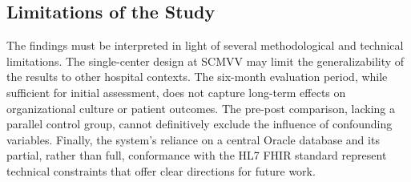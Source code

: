 \subsection{Limitations of the Study}
The findings must be interpreted in light of several methodological and technical limitations. The single-center design at SCMVV may limit the generalizability of the results to other hospital contexts. The six-month evaluation period, while sufficient for initial assessment, does not capture long-term effects on organizational culture or patient outcomes. The pre-post comparison, lacking a parallel control group, cannot definitively exclude the influence of confounding variables. Finally, the system's reliance on a central Oracle database and its partial, rather than full, conformance with the HL7 FHIR standard represent technical constraints that offer clear directions for future work.


